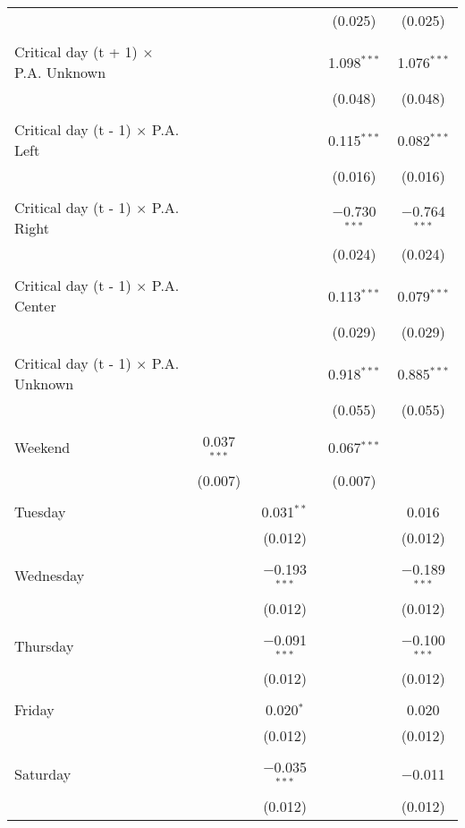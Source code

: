\documentclass[
]{article}
\begin{document}
\begin{table}[!htbp]
{\begin{tabular}{@{\extracolsep{5pt}}lcccc}
  &  &  & (0.025) & (0.025) \\ 
  & & & & \\ 
 Critical day (t + 1) $\times$ P.A. Unknown &  &  & 1.098$^{***}$ & 1.076$^{***}$ \\ 
  &  &  & (0.048) & (0.048) \\ 
  & & & & \\ 
 Critical day (t - 1) $\times$ P.A. Left &  &  & 0.115$^{***}$ & 0.082$^{***}$ \\ 
  &  &  & (0.016) & (0.016) \\ 
  & & & & \\ 
 Critical day (t - 1) $\times$ P.A. Right &  &  & $-$0.730$^{***}$ & $-$0.764$^{***}$ \\ 
  &  &  & (0.024) & (0.024) \\ 
  & & & & \\ 
 Critical day (t - 1) $\times$ P.A. Center &  &  & 0.113$^{***}$ & 0.079$^{***}$ \\ 
  &  &  & (0.029) & (0.029) \\ 
  & & & & \\ 
 Critical day (t - 1) $\times$ P.A. Unknown &  &  & 0.918$^{***}$ & 0.885$^{***}$ \\ 
  &  &  & (0.055) & (0.055) \\ 
  & & & & \\ 
 Weekend & 0.037$^{***}$ &  & 0.067$^{***}$ &  \\ 
  & (0.007) &  & (0.007) &  \\ 
  & & & & \\ 
 Tuesday &  & 0.031$^{**}$ &  & 0.016 \\ 
  &  & (0.012) &  & (0.012) \\ 
  & & & & \\ 
 Wednesday &  & $-$0.193$^{***}$ &  & $-$0.189$^{***}$ \\ 
  &  & (0.012) &  & (0.012) \\ 
  & & & & \\ 
 Thursday &  & $-$0.091$^{***}$ &  & $-$0.100$^{***}$ \\ 
  &  & (0.012) &  & (0.012) \\ 
  & & & & \\ 
 Friday &  & 0.020$^{*}$ &  & 0.020 \\ 
  &  & (0.012) &  & (0.012) \\ 
  & & & & \\ 
 Saturday &  & $-$0.035$^{***}$ &  & $-$0.011 \\ 
  &  & (0.012) &  & (0.012) \\ 

\end{tabular}}
\end{table}
\end{document}
